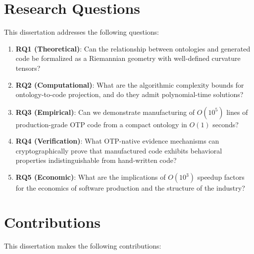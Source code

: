 \section{Research Questions}

This dissertation addresses the following questions:

\begin{enumerate}
    \item \textbf{RQ1 (Theoretical)}: Can the relationship between ontologies and generated code be formalized as a Riemannian geometry with well-defined curvature tensors?

    \item \textbf{RQ2 (Computational)}: What are the algorithmic complexity bounds for ontology-to-code projection, and do they admit polynomial-time solutions?

    \item \textbf{RQ3 (Empirical)}: Can we demonstrate manufacturing of $O(10^5)$ lines of production-grade OTP code from a compact ontology in $O(1)$ seconds?

    \item \textbf{RQ4 (Verification)}: What OTP-native evidence mechanisms can cryptographically prove that manufactured code exhibits behavioral properties indistinguishable from hand-written code?

    \item \textbf{RQ5 (Economic)}: What are the implications of $O(10^3)$ speedup factors for the economics of software production and the structure of the industry?
\end{enumerate}

\section{Contributions}

This dissertation makes the following contributions:

